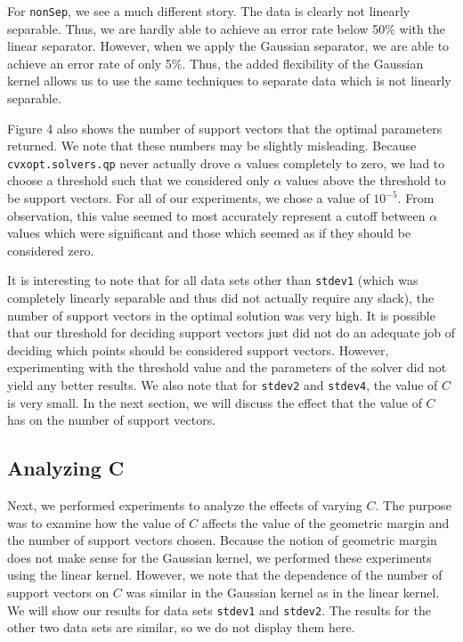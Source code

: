 \documentclass{sigchi}
\begin{document}
For \texttt{nonSep}, we see a much different story. The data is clearly not linearly separable. Thus, we are hardly able to achieve an error rate below 50\% with the linear separator. However, when we apply the Gaussian separator, we are able to achieve an error rate of only 5\%. Thus, the added flexibility of the Gaussian kernel allows us to use the same techniques to separate data which is not linearly separable.

Figure 4 also shows the number of support vectors that the optimal parameters returned. We note that these numbers may be slightly misleading. Because \texttt{cvxopt.solvers.qp} never actually drove $\alpha$ values completely to zero, we had to choose a threshold such that we considered only $\alpha$ values above the threshold to be support vectors. For all of our experiments, we chose a value of $10^{-5}$. From observation, this value seemed to most accurately represent a cutoff between $\alpha$ values which were significant and those which seemed as if they should be considered zero.

It is interesting to note that for all data sets other than \texttt{stdev1} (which was completely linearly separable and thus did not actually require any slack), the number of support vectors in the optimal solution was very high. It is possible that our threshold for deciding support vectors just did not do an adequate job of deciding which points should be considered support vectors. However, experimenting with the threshold value and the parameters of the solver did not yield any better results. We also note that for \texttt{stdev2} and \texttt{stdev4}, the value of $C$ is very small. In the next section, we will discuss the effect that the value of $C$ has on the number of support vectors.

\subsection{Analyzing C}

Next, we performed experiments to analyze the effects of varying $C$. The purpose was to examine how the value of $C$ affects the value of the geometric margin and the number of support vectors chosen. Because the notion of geometric margin does not make sense for the Gaussian kernel, we performed these experiments using the linear kernel. However, we note that the dependence of the number of support vectors on $C$ was similar in the Gaussian kernel as in the linear kernel. We will show our results for data sets \texttt{stdev1} and \texttt{stdev2}. The results for the other two data sets are similar, so we do not display them here.
\end{document}
